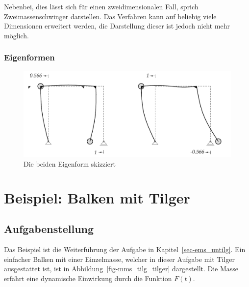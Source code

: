 \documentclass[
  letterpaper,
  DIV=11]{scrreprt}
\begin{document}
Nebenbei, dies lässt sich für einen zweidimensionalen Fall, sprich
Zweimassenschwinger darstellen. Das Verfahren kann auf beliebig viele
Dimensionen erweitert werden, die Darstellung dieser ist jedoch nicht
mehr möglich.

\hypertarget{eigenformen-1}{%
\subsection{Eigenformen}\label{eigenformen-1}}

\begin{figure}[H]

{\centering \includegraphics{index_files/mediabag/bilder/aufgabe_mms_nach_eigenvekt1.pdf}

}

\caption{\label{fig-mms_nach_eigenformen}Die beiden Eigenform skizziert}

\end{figure}

\hypertarget{sec-tilger}{%
\chapter{Beispiel: Balken mit Tilger}\label{sec-tilger}}

\hypertarget{aufgabenstellung-12}{%
\section{Aufgabenstellung}\label{aufgabenstellung-12}}

Das Beispiel ist die Weiterführung der Aufgabe in
Kapitel~\ref{sec-ems_untilg}. Ein einfacher Balken mit einer
Einzelmasse, welcher in dieser Aufgabe mit Tilger ausgestattet ist, ist
in Abbildung~\ref{fig-mms_tilg_tilger} dargestellt. Die Masse erfährt
eine dynamische Einwirkung durch die Funktion \(F(t)\).
\end{document}
